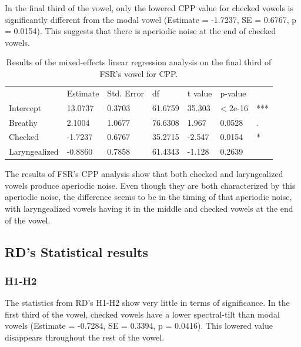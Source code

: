 \documentclass[12pt, letterpaper]{article}
\providecommand{\lsptoprule}{\midrule\toprule}
\providecommand{\lspbottomrule}{\bottomrule\midrule}
\begin{document}
In the final third of the vowel, only the lowered CPP value for checked vowels is significantly different from the modal vowel (Estimate = -1.7237, SE = 0.6767, p = 0.0154). This suggests that there is aperiodic noise at the end of checked vowels.

\begin{table}[!h]
    \centering
    \caption{Results of the mixed-effects linear regression analysis on the final third of FSR's vowel for CPP. }
    \label{tab:FSR_CPP_Third}
    \begin{tabular}{lllllll}
	\lsptoprule
					&  Estimate  & Std. Error & df & t value & p-value & \\
        Intercept       &  13.0737  & 0.3703 & 61.6759 & 35.303  & < 2e-16 & *** \\  
  	Breathy   		&   2.1004  & 1.0677 & 76.6308 &  1.967  &  0.0528 & .\\
	Checked    		&  -1.7237  & 0.6767 & 35.2715 & -2.547  &  0.0154 & * \\
	Laryngealized	&  -0.8860  & 0.7858 & 61.4343 & -1.128  &  0.2639 &  \\
        \lspbottomrule
    \end{tabular}
\end{table}

The results of FSR's CPP analysis show that both checked and laryngealized vowels produce aperiodic noise. Even though they are both characterized by this aperiodic noise, the difference seems to be in the timing of that aperiodic noise, with laryngealized vowels having it in the middle and checked vowels at the end of the vowel. 

\subsection{RD's Statistical results} \label{sec:RDStats}

\subsubsection{H1-H2}

The statistics from RD's H1-H2 show very little in terms of significance. In the first third of the vowel, checked vowels have a lower spectral-tilt than modal vowels (Estimate = -0.7284, SE = 0.3394, p = 0.0416). This lowered value disappears throughout the rest of the vowel. 
\end{document}
